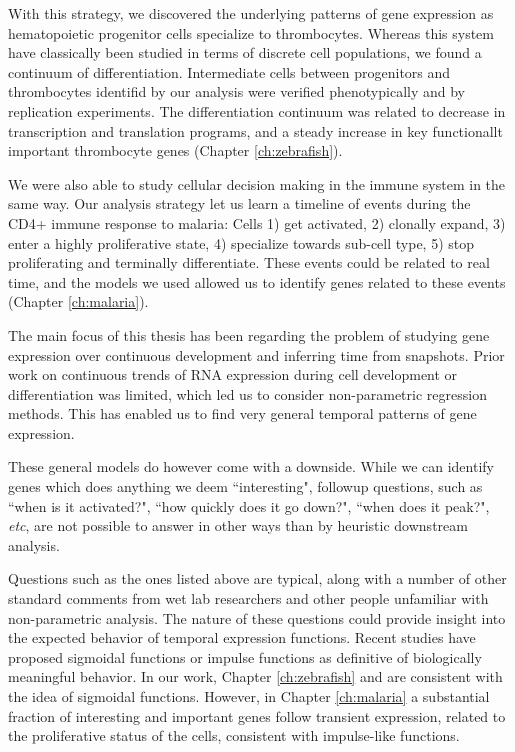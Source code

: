 With this strategy, we discovered the underlying patterns of gene expression as hematopoietic progenitor cells specialize to thrombocytes. Whereas this system have classically been studied in terms of discrete cell populations, we found a continuum of differentiation. Intermediate cells between progenitors and thrombocytes identifid by our analysis were verified phenotypically and by replication experiments. The differentiation continuum was related to decrease in transcription and translation programs, and a steady increase in key functionallt important thrombocyte genes (Chapter \ref{ch:zebrafish}).

We were also able to study cellular decision making in the immune system in the same way. Our analysis strategy let us learn a timeline of events during the CD4+ immune response to malaria: Cells 1) get activated, 2) clonally expand, 3) enter a highly proliferative state, 4) specialize towards sub-cell type, 5) stop proliferating and terminally differentiate. These events could be related to real time, and the models we used allowed us to identify genes related to these events (Chapter \ref{ch:malaria}).

The main focus of this thesis has been regarding the problem of studying gene expression over continuous development and inferring time from snapshots. Prior work on continuous trends of RNA expression during cell development or differentiation was limited, which led us to consider non-parametric regression methods. This has enabled us to find very general temporal patterns of gene expression.

These general models do however come with a downside. While we can identify genes which does anything we deem ``interesting", followup questions, such as ``when is it activated?", ``how quickly does it go down?", ``when does it peak?", \textit{etc}, are not possible to answer in other ways than by heuristic downstream analysis.

Questions such as the ones listed above are typical, along with a number of other standard comments from wet lab researchers and other people unfamiliar with non-parametric analysis. The nature of these questions could provide insight into the expected behavior of temporal expression functions. Recent studies have proposed sigmoidal functions \cite{Campbell2016-bd} or impulse functions \cite{Sander2016-by} as definitive of biologically meaningful behavior. In our work, Chapter \ref{ch:zebrafish} and \cite{Eckersley-Maslin2016-cz} are consistent with the idea of sigmoidal functions. However, in Chapter \ref{ch:malaria} a substantial fraction of interesting and important genes follow transient expression, related to the proliferative status of the cells, consistent with impulse-like functions.

